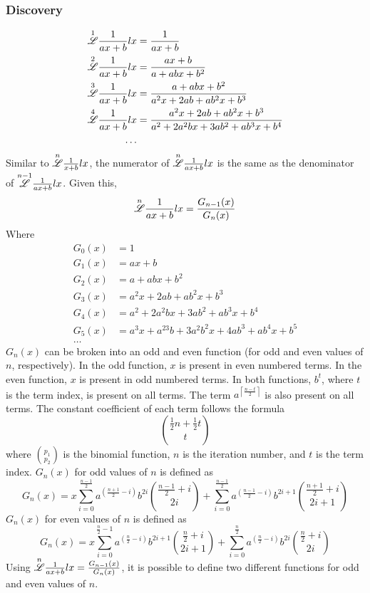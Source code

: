 \documentclass[12pt, letterpaper]{article}
\begin{document}
\subsubsection{Discovery}
\begin{equation}
    \begin{split}
        \overset{1}{\mathscr{L}} \frac{1}{ax+b} lx & = \frac{1}{ax+b}\\
        \overset{2}{\mathscr{L}} \frac{1}{ax+b} lx & = \frac{ax+b}{a+abx+b^2}\\
        \overset{3}{\mathscr{L}} \frac{1}{ax+b} lx & = \frac{a+abx+b^2}{a^2x+2ab+ab^2x+b^3}\\
        \overset{4}{\mathscr{L}} \frac{1}{ax+b} lx & = \frac{a^2x+2ab+ab^2x+b^3}{a^2+2a^2bx+3ab^2+ab^3x+b^4}\\
        \dots
    \end{split}
\end{equation}
Similar to $\overset{n}{\mathscr{L}} \frac{1}{x+b} lx$, the numerator of $\overset{n}{\mathscr{L}} \frac{1}{ax+b} lx$ is the same as the denominator of $\overset{n-1}{\mathscr{L}} \frac{1}{ax+b} lx$. Given this,
$$\overset{n}{\mathscr{L}} \frac{1}{ax+b} lx = \frac{G_{n-1}(x)}{G_n(x)}$$
Where
\begin{equation}
    \begin{split}
        G_0(x) & = 1\\
        G_1(x) & = ax+b\\
        G_2(x) & = a+abx+b^2\\
        G_3(x) & = a^2x+2ab+ab^2x+b^3\\
        G_4(x) & = a^2+2a^2bx+3ab^2+ab^3x+b^4\\
        G_5(x) & = a^3x+a^23b+3a^2b^2x+4ab^3+ab^4x+b^5\\
        \dots 
    \end{split}
\end{equation}
$G_n(x)$ can be broken into an odd and even function (for odd and even values of $n$, respectively). In the odd function, $x$ is present in even numbered terms. In the even function, $x$ is present in odd numbered terms. In both functions, $b^t$, where $t$ is the term index, is present on all terms. The term $a^{\left\lceil{\frac{n-t}{2}}\right\rceil}$ is also present on all terms. The constant coefficient of each term follows the formula 
$$\binom{\frac{1}{2}n+\frac{1}{2}t}{t}$$
where $\binom{p_1}{p_2}$ is the binomial function, $n$ is the iteration number, and $t$ is the term index. $G_n(x)$ for odd values of $n$ is defined as
$$G_n(x) = x\sum^\frac{n-1}{2}_{i=0}a^{(\frac{n+1}{2}-i)}b^{2i}\binom{\frac{n-1}{2}+i}{2i}+\sum^\frac{n-1}{2}_{i=0}a^{(\frac{n-1}{2}-i)}b^{2i+1}\binom{\frac{n+1}{2}+i}{2i+1}$$
$G_n(x)$ for even values of $n$ is defined as
$$G_n(x) = x\sum^{\frac{n}{2}-1}_{i=0}a^{(\frac{n}{2}-i)}b^{2i+1}\binom{\frac{n}{2}+i}{2i+1}+\sum^\frac{n}{2}_{i=0}a^{(\frac{n}{2}-i)}b^{2i}\binom{\frac{n}{2}+i}{2i}$$
Using $\overset{n}{\mathscr{L}} \frac{1}{ax+b} lx = \frac{G_{n-1}(x)}{G_n(x)}$, it is possible to define two different functions for odd and even values of $n$.
\end{document}
